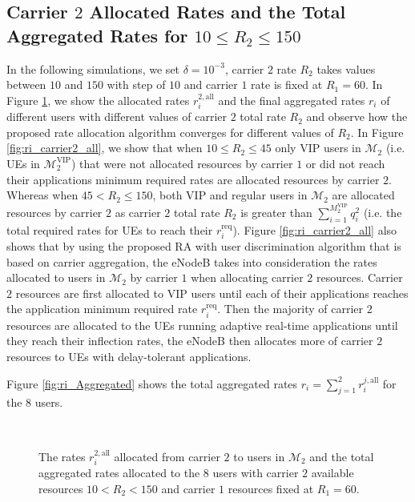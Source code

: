 \documentclass[journal]{IEEEtran} 				\IEEEoverridecommandlockouts 						\usepackage{amsmath,amssymb}
\begin{document}
\subsection{Carrier $2$ Allocated Rates and the Total Aggregated Rates for $10\le R_2 \le 150$}
In the following simulations, we set $\delta =10^{-3}$, carrier $2$ rate $R_2$ takes values between $10$ and $150$ with step of $10$ and carrier $1$ rate is fixed at $R_1 = 60$. In Figure \ref{fig:ri_carrier2}, we show the allocated rates $r_i^{2,\text{all}}$ and the final aggregated rates $r_i$ of different users with different values of carrier $2$ total rate $R_2$ and observe how the proposed rate allocation algorithm converges for different values of $R_2$. In Figure \ref{fig:ri_carrier2_all}, we show that when $10\le R_2 \le 45$ only VIP users in $\mathcal{M}_2$ (i.e. UEs in $\mathcal{M}_2^{\text{VIP}}$) that were not allocated resources by carrier $1$ or did not reach their applications minimum required rates are allocated resources by carrier $2$. Whereas when $45 < R_2 \le 150$, both VIP and regular users in $\mathcal{M}_2$ are allocated resources by carrier $2$ as carrier $2$ total rate $R_2$ is greater than $\sum_{i=1}^{M_2^{\text{VIP}}} q_i^2$ (i.e. the total required rates for UEs to reach their $r_i^{\text{req}}$). Figure \ref{fig:ri_carrier2_all} also shows that by using the proposed RA with user discrimination algorithm that is based on carrier aggregation, the eNodeB takes into consideration the rates allocated to users in $\mathcal{M}_2$ by carrier $1$ when allocating carrier $2$ resources. Carrier $2$ resources are first allocated to VIP users until each of their applications reaches the application minimum required rate $r_i^{\text{req}}$. Then the majority of carrier $2$ resources are allocated to the UEs running adaptive real-time applications until they reach their inflection rates, the eNodeB then allocates more of carrier $2$ resources to UEs with delay-tolerant applications.

Figure \ref{fig:ri_Aggregated} shows the total aggregated rates $r_i = \sum_{j=1}^{2}r_i^{j,\text{all}}$ for the $8$ users.

\begin{figure}[tb]
  \centering
  \\\caption{The rates $r_i^{2,\text{all}}$ allocated from carrier $2$ to users in $\mathcal{M}_2$ and the total aggregated rates allocated to the $8$ users with carrier $2$ available resources $10<R_2<150$ and carrier $1$ resources fixed at $R_1=60$.}
\label{fig:ri_carrier2}
\end{figure}
\end{document}
